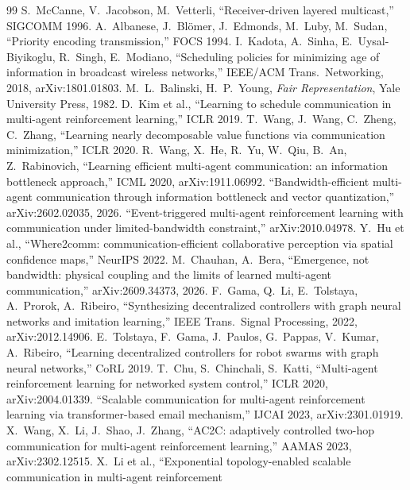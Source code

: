 \documentclass[11pt]{article}
\theoremstyle{definition}
\begin{document}
\begin{thebibliography}{99}
 S.~McCanne, V.~Jacobson, M.~Vetterli, ``Receiver-driven layered multicast,'' SIGCOMM 1996.
 A.~Albanese, J.~Bl\"omer, J.~Edmonds, M.~Luby, M.~Sudan, ``Priority encoding transmission,'' FOCS 1994.
 I.~Kadota, A.~Sinha, E.~Uysal-Biyikoglu, R.~Singh, E.~Modiano, ``Scheduling policies for minimizing
age of information in broadcast wireless networks,'' IEEE/ACM Trans.\ Networking, 2018, arXiv:1801.01803.
 M.~L.~Balinski, H.~P.~Young, \emph{Fair Representation}, Yale University Press, 1982.
 D.~Kim et al., ``Learning to schedule communication in multi-agent reinforcement learning,'' ICLR 2019.
 T.~Wang, J.~Wang, C.~Zheng, C.~Zhang, ``Learning nearly decomposable value functions via communication
minimization,'' ICLR 2020.
 R.~Wang, X.~He, R.~Yu, W.~Qiu, B.~An, Z.~Rabinovich, ``Learning efficient multi-agent communication: an
information bottleneck approach,'' ICML 2020, arXiv:1911.06992.
 ``Bandwidth-efficient multi-agent communication through information bottleneck and vector quantization,''
arXiv:2602.02035, 2026.
 ``Event-triggered multi-agent reinforcement learning with communication under limited-bandwidth
constraint,'' arXiv:2010.04978.
 Y.~Hu et al., ``Where2comm: communication-efficient collaborative perception via spatial confidence
maps,'' NeurIPS 2022.
 M.~Chauhan, A.~Bera, ``Emergence, not bandwidth: physical coupling and the limits of learned
multi-agent communication,'' arXiv:2609.34373, 2026.
 F.~Gama, Q.~Li, E.~Tolstaya, A.~Prorok, A.~Ribeiro, ``Synthesizing decentralized controllers with graph
neural networks and imitation learning,'' IEEE Trans.\ Signal Processing, 2022, arXiv:2012.14906.
 E.~Tolstaya, F.~Gama, J.~Paulos, G.~Pappas, V.~Kumar, A.~Ribeiro, ``Learning decentralized
controllers for robot swarms with graph neural networks,'' CoRL 2019.
 T.~Chu, S.~Chinchali, S.~Katti, ``Multi-agent reinforcement learning for networked system control,''
ICLR 2020, arXiv:2004.01339.
 ``Scalable communication for multi-agent reinforcement learning via transformer-based email mechanism,''
IJCAI 2023, arXiv:2301.01919.
 X.~Wang, X.~Li, J.~Shao, J.~Zhang, ``AC2C: adaptively controlled two-hop communication for multi-agent
reinforcement learning,'' AAMAS 2023, arXiv:2302.12515.
 X.~Li et al., ``Exponential topology-enabled scalable communication in multi-agent reinforcement

\end{thebibliography}
\end{document}
